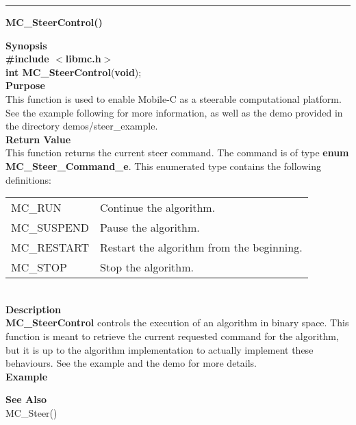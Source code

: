 \noindent
\vspace{5pt}
\rule{6.5in}{0.015in}
\noindent
{}
{\LARGE \bf MC\_SteerControl()}\\

\noindent
{\bf Synopsis}\\
{\bf \#include $<$libmc.h$>$}\\
{\bf int MC\_SteerControl}({\bf void});\\

\noindent
{\bf Purpose}\\
This function is used to enable Mobile-C as a steerable computational
platform. See the example following for more information, as well
as the demo provided in the directory demos/steer\_example.\\

\noindent
{\bf Return Value}\\
This function returns the current steer command. The command is of type
{\bf enum MC\_Steer\_Command\_e}. This enumerated type contains the following 
definitions:\\
\begin{tabular}{p{55 mm}p{120 mm}}
MC\_RUN & Continue the algorithm. \\
MC\_SUSPEND & Pause the algorithm. \\
MC\_RESTART & Restart the algorithm from the beginning. \\
MC\_STOP & Stop the algorithm.
\end{tabular}\\

\noindent
{\bf Description}\\
{\bf MC\_SteerControl} controls the execution of an algorithm in binary space. 
This function is meant to retrieve the current requested command for the algorithm,
but it is up to the algorithm implementation to actually implement these
behaviours. See the example and the demo for more details.\\ \noindent
{\bf Example}\\
\noindent
{\footnotesize }

\noindent
{\bf See Also}\\
MC\_Steer()

